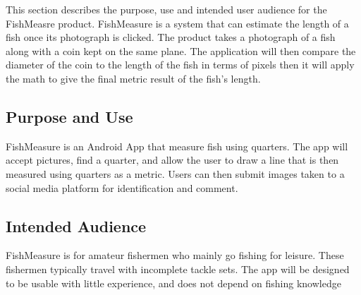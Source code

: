 This section describes the purpose, use and intended user audience for the FishMeasre product. FishMeasure is a system that can estimate the length of a fish once its photograph is clicked. The product takes a photograph of a fish along with a coin kept on the same plane. The application will then compare the diameter of the coin to the length of the fish in terms of pixels then it will apply the math to give the final metric result of the fish's length.

\subsection{Purpose and Use}
FishMeasure is an Android App that measure fish using quarters. The app will accept pictures, find a quarter, and allow the user to draw a line that is then measured using quarters as a metric. Users can then submit images taken to a social media platform for identification and comment.

\subsection{Intended Audience}
FishMeasure is for amateur fishermen who mainly go fishing for leisure. These fishermen typically travel with incomplete tackle sets. The app will be designed to be usable with little experience, and does not depend on fishing knowledge
